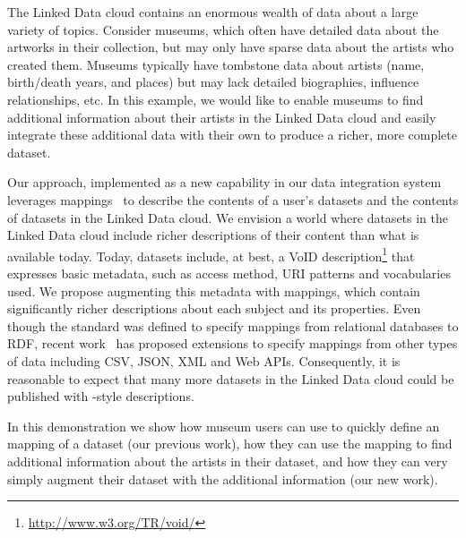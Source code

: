 The Linked Data cloud contains an enormous wealth of data about a large variety of topics.
Consider museums, which often have detailed data about the artworks in their collection, but may only have sparse data about the artists who created them.
Museums typically have tombstone data about artists (name, birth/death years, and places) but may lack detailed biographies, influence relationships, etc.
In this example, we would like to enable museums to find additional information about their artists in the Linked Data cloud and easily integrate these additional data with their own to produce a richer, more complete dataset.

Our approach, implemented as a new capability in our \karma data integration system~\cite{knoblock12:eswc} leverages \rtworml mappings~\cite{Sundara:12:RRR} to describe the contents of a user's datasets and the contents of datasets in the Linked Data cloud.
We envision a world where datasets in the Linked Data cloud include richer descriptions of their content than what is available today.
Today, datasets include, at best, a VoID description\footnote{\url{http://www.w3.org/TR/void/}} that expresses basic metadata, such as access method, URI patterns and vocabularies used.
We propose augmenting this metadata with \rtworml mappings, which contain significantly richer descriptions about each subject and its properties.
Even though the \rtworml standard was defined to specify mappings from relational databases to RDF, recent work~\cite{conf/semweb/DimouSCMW13} has proposed extensions to specify mappings from other types of data including CSV, JSON, XML and Web APIs.
Consequently, it is reasonable to expect that many more datasets in the Linked Data cloud could be published with \rtworml-style descriptions.

In this demonstration we show how museum users can use \karma to quickly define an \rtworml mapping of a dataset (our previous work), how they can use the \rtworml mapping to find additional information about the artists in their dataset, and how they can very simply augment their dataset with the additional information (our new work).